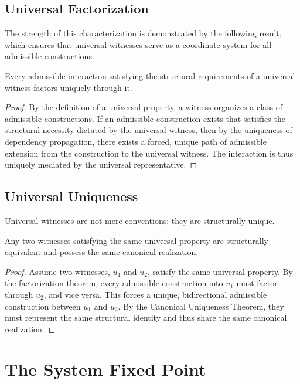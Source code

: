 \documentclass[12pt,anyside]{book}
\begin{document}
\subsection{Universal Factorization}
The strength of this characterization is demonstrated by the following result, which ensures that universal witnesses serve as a coordinate system for all admissible constructions.

\begin{theorem}
Every admissible interaction satisfying the structural requirements of a universal witness factors uniquely through it.
\end{theorem}
\begin{proof}
By the definition of a universal property, a witness organizes a class of admissible constructions. If an admissible construction exists that satisfies the structural necessity dictated by the universal witness, then by the uniqueness of dependency propagation, there exists a forced, unique path of admissible extension from the construction to the universal witness. The interaction is thus uniquely mediated by the universal representative.
\end{proof}

\subsection{Universal Uniqueness}
Universal witnesses are not mere conventions; they are structurally unique.

\begin{theorem}
Any two witnesses satisfying the same universal property are structurally equivalent and possess the same canonical realization.
\end{theorem}
\begin{proof}
Assume two witnesses, $u_1$ and $u_2$, satisfy the same universal property. By the factorization theorem, every admissible construction into $u_1$ must factor through $u_2$, and vice versa. This forces a unique, bidirectional admissible construction between $u_1$ and $u_2$. By the Canonical Uniqueness Theorem, they must represent the same structural identity and thus share the same canonical realization.
\end{proof}

\section{The System Fixed Point}
\end{document}
